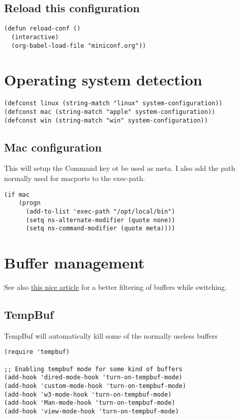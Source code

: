 \documentclass[11pt]{article}
\begin{document}
\subsection{Reload this configuration}
\label{sec-18.3}

\begin{verbatim}
(defun reload-conf ()
  (interactive)
  (org-babel-load-file "miniconf.org"))
\end{verbatim}
\section{Operating system detection}
\label{sec-19}

\begin{verbatim}
(defconst linux (string-match "linux" system-configuration))
(defconst mac (string-match "apple" system-configuration))
(defconst win (string-match "win" system-configuration))
\end{verbatim}
\subsection{Mac configuration}
\label{sec-19.1}

    This will setup the Command key ot be used as meta.
    I also add the path normally used for macports to the exec-path.
\begin{verbatim}
(if mac
    (progn
      (add-to-list 'exec-path "/opt/local/bin")
      (setq ns-alternate-modifier (quote none))
      (setq ns-command-modifier (quote meta))))
\end{verbatim}
\section{Buffer management}
\label{sec-20}

  See also \href{http://scottfrazersblog.blogspot.com/2010/01/emacs-filtered-buffer-switching.html}{this nice article} for a better filtering of buffers while switching.
\subsection{TempBuf}
\label{sec-20.1}

   TempBuf will automatically kill some of the normally useless buffers
\begin{verbatim}
(require 'tempbuf)

;; Enabling tempbuf mode for some kind of buffers
(add-hook 'dired-mode-hook 'turn-on-tempbuf-mode)
(add-hook 'custom-mode-hook 'turn-on-tempbuf-mode)
(add-hook 'w3-mode-hook 'turn-on-tempbuf-mode)
(add-hook 'Man-mode-hook 'turn-on-tempbuf-mode)
(add-hook 'view-mode-hook 'turn-on-tempbuf-mode)
\end{verbatim}
\end{document}
